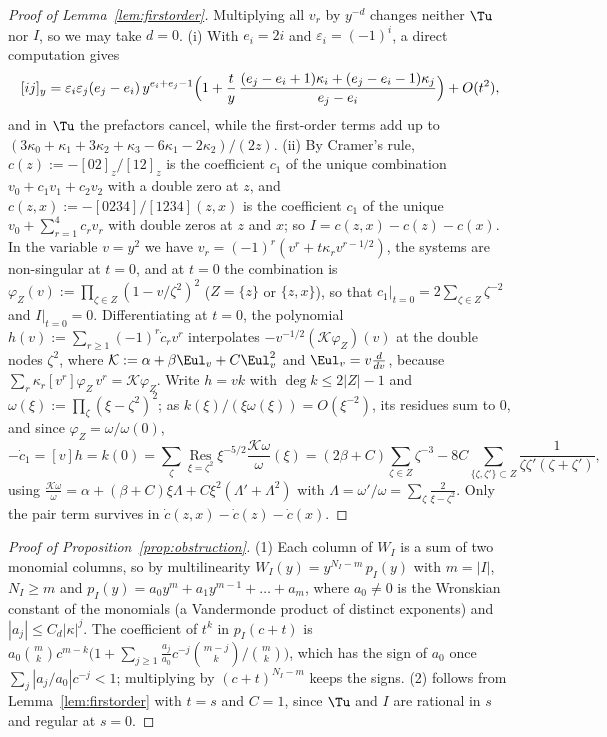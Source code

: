 \begin{proof}[Proof of Lemma~\textup{\ref{lem:firstorder}}]
Multiplying all $v_r$ by $y^{-d}$ changes neither $\Tu$ nor $I$, so we may take $d=0$.
(i) With $e_i=2i$ and $\varepsilon_i=(-1)^i$, a direct computation gives
\[
  [ij]_y=\varepsilon_i\varepsilon_j(e_j-e_i)\,y^{e_i+e_j-1}\Bigl(1+\frac ty\,\frac{(e_j-e_i+1)\kappa_i+(e_j-e_i-1)\kappa_j}{e_j-e_i}\Bigr)+O(t^2),
\]
and in $\Tu$ the prefactors cancel, while the first-order terms add up to $(3\kappa_0+\kappa_1+3\kappa_2+\kappa_3-6\kappa_1-2\kappa_2)/(2z)$.
(ii) By Cramer's rule, $c(z):=-[02]_z/[12]_z$ is the coefficient $c_1$ of the unique combination $v_0+c_1v_1+c_2v_2$ with
a double zero at $z$, and $c(z,x):=-[0234]/[1234](z,x)$ is the coefficient $c_1$ of the unique
$v_0+\sum_{r=1}^4c_rv_r$ with double zeros at $z$ and $x$; so $I=c(z,x)-c(z)-c(x)$. In the variable $v=y^2$ we have
$v_r=(-1)^r(v^r+t\kappa_rv^{r-1/2})$, the systems are non-singular at $t=0$, and at $t=0$ the combination is
$\varphi_Z(v):=\prod_{\zeta\in Z}(1-v/\zeta^2)^2$ ($Z=\{z\}$ or $\{z,x\}$), so that
$c_1|_{t=0}=2\sum_{\zeta\in Z}\zeta^{-2}$ and $I|_{t=0}=0$. Differentiating at $t=0$, the polynomial
$h(v):=\sum_{r\ge1}(-1)^r\dot c_rv^r$ interpolates $-v^{-1/2}(\mathcal K\varphi_Z)(v)$ at the double nodes $\zeta^2$, where
$\mathcal K:=\alpha+\beta\Eul_v+C\Eul_v^2$ and $\Eul_v=v\frac{d}{dv}$, because $\sum_r\kappa_r[v^r]\varphi_Z\,v^r=\mathcal K\varphi_Z$.
Write $h=vk$ with $\deg k\le2|Z|-1$ and $\omega(\xi):=\prod_{\zeta}(\xi-\zeta^2)^2$; as $k(\xi)/(\xi\omega(\xi))=O(\xi^{-2})$, its
residues sum to $0$, and since $\varphi_Z=\omega/\omega(0)$,
\[
  -\dot c_1=[v]h=k(0)=\sum_{\zeta}\operatorname*{Res}_{\xi=\zeta^2}\xi^{-5/2}\frac{\mathcal K\omega}{\omega}(\xi)
  =(2\beta+C)\sum_{\zeta\in Z}\zeta^{-3}-8C\sum_{\{\zeta,\zeta'\}\subset Z}\frac1{\zeta\zeta'(\zeta+\zeta')},
\]
using $\frac{\mathcal K\omega}{\omega}=\alpha+(\beta+C)\xi\Lambda+C\xi^2(\Lambda'+\Lambda^2)$ with
$\Lambda=\omega'/\omega=\sum_\zeta\frac2{\xi-\zeta^2}$. Only the pair term survives in $\dot c(z,x)-\dot c(z)-\dot c(x)$.
\end{proof}


\begin{proof}[Proof of Proposition~\textup{\ref{prop:obstruction}}]
(1) Each column of $W_I$ is a sum of two monomial columns, so by multilinearity
$W_I(y)=y^{N_I-m}\,p_I(y)$ with $m=|I|$, $N_I\ge m$ and $p_I(y)=a_0y^m+a_1y^{m-1}+\dots+a_m$, where $a_0\neq0$ is the
Wronskian constant of the monomials (a Vandermonde product of distinct exponents) and $|a_j|\le C_d|\kappa|^j$. The
coefficient of $t^k$ in $p_I(c+t)$ is $a_0\binom mkc^{m-k}\bigl(1+\sum_{j\ge1}\frac{a_j}{a_0}c^{-j}\binom{m-j}k/\binom mk\bigr)$,
which has the sign of $a_0$ once $\sum_j|a_j/a_0|c^{-j}<1$; multiplying by $(c+t)^{N_I-m}$ keeps the signs. (2) follows
from Lemma~\ref{lem:firstorder} with $t=s$ and $C=1$, since $\Tu$ and $I$ are rational in $s$ and regular at $s=0$.
\end{proof}

